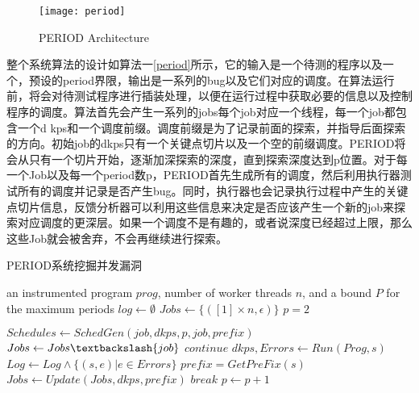 \begin{figure}[ht]
    \centering
    \texttt{[image: period]}
    \caption{\label{fig:period_arch}PERIOD Architecture}
\end{figure}

整个系统算法的设计如算法一\autoref{period}所示，它的输入是一个待测的程序以及一个，预设的period界限，输出是一系列的bug以及它们对应的调度。在算法运行前，将会对待测试程序进行插装处理，以便在运行过程中获取必要的信息以及控制程序的调度。算法首先会产生一系列的jobs每个job对应一个线程，每一个job都包含一个d kps和一个调度前缀。调度前缀是为了记录前面的探索，并指导后面探索的方向。初始job的dkps只有一个关键点切片以及一个空的前缀调度。PERIOD将会从只有一个切片开始，逐渐加深探索的深度，直到探索深度达到p位置。对于每一个Job以及每一个period数p，PERIOD首先生成所有的调度，然后利用执行器测试所有的调度并记录是否产生bug。同时，执行器也会记录执行过程中产生的关键点切片信息，反馈分析器可以利用这些信息来决定是否应该产生一个新的job来探索对应调度的更深层。如果一个调度不是有趣的，或者说深度已经超过上限，那么这些Job就会被舍弃，不会再继续进行探索。

\begin{algorithm}[!ht]
\caption{PERIOD系统挖掘并发漏洞}
\label{period}
\begin{algorithmic}[1]
    \REQUIRE an instrumented program $prog$, number of worker threads $n$, and a bound $P$ for the maximum periods
    \STATE $log \leftarrow \emptyset$
    \STATE $Jobs \leftarrow \{([1] \times n, \epsilon)\}$
    \STATE $p = 2$

            \STATE $Schedules \leftarrow SchedGen(job, dkps, p, job, prefix)$
                \STATE $Jobs \leftarrow Jobs \textbackslash \{job\}$
                \STATE $continue$
            \ENDIF
                \STATE $dkps, Errors \leftarrow Run(Prog, s)$
                \STATE $Log \leftarrow Log \wedge \{(s,e) | e \in Errors\}$
                \STATE $prefix = GetPreFix(s)$
                \STATE $Jobs \leftarrow Update(Jobs, dkps, prefix)$
            \ENDFOR
        \ENDFOR
            \STATE $break$
        \ENDIF
        \STATE $p \leftarrow p+1$
    \ENDWHILE
\end{algorithmic}  
\end{algorithm}

